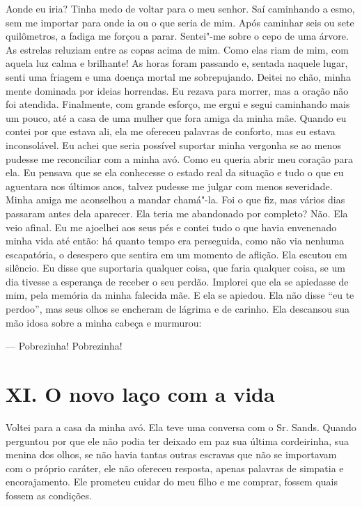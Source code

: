 Aonde eu iria? Tinha medo de voltar
para o meu senhor. Saí caminhando a esmo, sem me importar para onde ia
ou o que seria de mim. Após caminhar seis ou sete quilômetros, a fadiga
me forçou a parar. Sentei"-me sobre o cepo de uma árvore. As estrelas
reluziam entre as copas acima de mim. Como elas riam de mim, com aquela
luz calma e brilhante! As horas foram passando e, sentada naquele lugar,
senti uma friagem e uma doença mortal me sobrepujando. Deitei no chão,
minha mente dominada por ideias horrendas. Eu rezava para morrer, mas a
oração não foi atendida. Finalmente, com grande esforço, me ergui e
segui caminhando mais um pouco, até a casa de uma mulher que fora amiga
da minha mãe. Quando eu contei por que estava ali, ela me ofereceu
palavras de conforto, mas eu estava inconsolável. Eu achei que seria
possível suportar minha vergonha se ao menos pudesse me reconciliar com
a minha avó. Como eu queria abrir meu coração para ela. Eu pensava que
se ela conhecesse o estado real da situação e tudo o que eu aguentara
nos últimos anos, talvez pudesse me julgar com menos severidade. Minha
amiga me aconselhou a mandar chamá"-la. Foi o que fiz, mas vários dias
passaram antes dela aparecer. Ela teria me abandonado por completo? Não.
Ela veio afinal. Eu me ajoelhei aos seus pés e contei tudo o que havia
envenenado minha vida até então: há quanto tempo era perseguida, como
não via nenhuma escapatória, o desespero que sentira em um momento de
aflição. Ela escutou em silêncio. Eu disse que suportaria qualquer
coisa, que faria qualquer coisa, se um dia tivesse a esperança de
receber o seu perdão. Implorei que ela se apiedasse de mim, pela memória
da minha falecida mãe. E ela se apiedou. Ela não disse ``eu te perdoo'',
mas seus olhos se encheram de lágrima e de carinho. Ela descansou sua
mão idosa sobre a minha cabeça e murmurou:

--- Pobrezinha! Pobrezinha!

\chapter{XI. O novo laço com a
vida}

Voltei para a casa da minha avó. Ela
teve uma conversa com o Sr. Sands. Quando perguntou por que ele não
podia ter deixado em paz sua última cordeirinha, sua menina dos olhos,
se não havia tantas outras escravas que não se importavam com o próprio
caráter, ele não ofereceu resposta, apenas palavras de simpatia e
encorajamento. Ele prometeu cuidar do meu filho e me comprar, fossem
quais fossem as condições.

